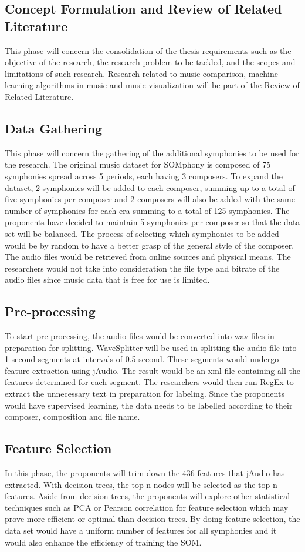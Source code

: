 \subsection{Concept Formulation and Review of Related Literature}
This phase will concern the consolidation of the thesis requirements such as the objective of the research, the research problem to be tackled, and the scopes and limitations of such research. Research related to music comparison, machine learning algorithms in music and music visualization will be part of the Review of Related Literature.

\subsection{Data Gathering}
This phase will concern the  gathering of the additional symphonies to be used for the research. The original music dataset for SOMphony is composed of 75 symphonies spread across 5 periods, each having 3 composers. To expand the dataset, 2 symphonies will be added to each composer, summing up to a total of five symphonies per composer and 2 composers will also be added with the same number of symphonies for each era summing to a total of 125 symphonies. The proponents have decided to maintain 5 symphonies per composer so that the data set will be balanced. The process of selecting which symphonies to be added would be by random to have a better grasp of the general style of the composer. The audio files would be retrieved from online sources and physical means. The researchers  would not take into consideration the file type and bitrate of the audio files since music data that is free for use is limited. 

\subsection{Pre-processing}
To start pre-processing,  the audio files would be converted into wav files in preparation for splitting. WaveSplitter will be used in splitting the audio file into 1 second segments at intervals of 0.5 second. These segments would undergo feature extraction using jAudio. The result would be an xml file containing all the features determined for each segment. The researchers would then run RegEx to extract the unnecessary text in preparation for labeling. Since the proponents would have supervised learning, the data needs to be labelled according to their composer, composition and file name.

\subsection{Feature Selection}
In this phase, the proponents will trim down the 436 features that jAudio has extracted. With decision trees, the top n nodes will be selected as the top n features. Aside from decision trees, the proponents will explore other statistical techniques such as PCA or Pearson correlation for feature selection which may prove more efficient or optimal than decision trees. By doing feature selection, the data set would have a uniform number of features for all symphonies and it would also enhance the efficiency of training the SOM.

